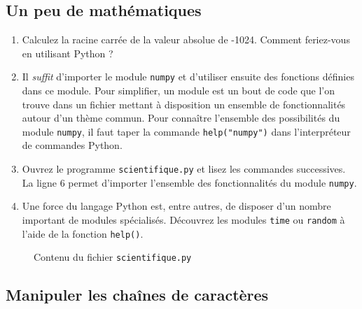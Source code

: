 \subsection{Un peu de mathématiques}

\begin{enumerate}
\item Calculez la racine carrée de la valeur absolue de -1024.
  Comment feriez-vous en utilisant Python ?


\item Il \textit{suffit} d'importer le module \texttt{numpy} et d'utiliser ensuite
  des fonctions définies dans ce module.
  Pour simplifier, un module est un bout de code que l'on trouve dans un fichier
  mettant à disposition un ensemble de fonctionnalités autour d'un thème commun.
  Pour connaître l'ensemble des possibilités du module \texttt{numpy}, il faut taper la commande
  \texttt{help("numpy")} dans l'interpréteur de commandes Python.


\item Ouvrez le programme \texttt{scientifique.py} et lisez les commandes successives.
  La ligne 6 permet d'importer l'ensemble des fonctionnalités du module \texttt{numpy}.


\item Une force du langage Python est, entre autres, de disposer d'un nombre important de modules spécialisés.
  Découvrez les modules \texttt{time} ou \texttt{random} à l'aide de la fonction \texttt{help()}.



\end{enumerate}


\begin{figure}  
  
  \caption{Contenu du fichier \texttt{scientifique.py}}
  \label{polynome_scientifique}
\end{figure}


\subsection{Manipuler les chaînes de caractères}


